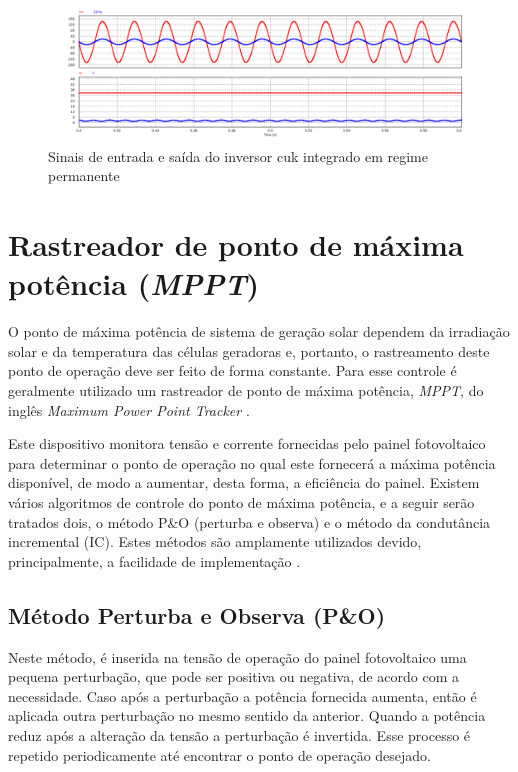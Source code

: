 \documentclass[
	12pt,				%
	openany,
	onseside,
	a4paper,			%
	english,			%
	french,				%
	spanish,			%
	brazil,				%
	]{abntex2}
\begin{document}
\begin{figure}[H]
	\centering
		\includegraphics[width= \linewidth]{cuk_integ_In_Out_zoom}
		\caption{Sinais de entrada e saída do inversor cuk integrado em regime permanente}
		\label{fig:integ_cuk_In_Out_zoom}
\end{figure}


\section{Rastreador de ponto de máxima potência (\textit{MPPT})}

O ponto de máxima potência de sistema de geração solar dependem da irradiação solar e da temperatura das células geradoras e, portanto, o rastreamento deste ponto de operação deve ser feito de forma constante. Para esse controle é geralmente utilizado um rastreador de ponto de máxima potência, \emph{MPPT}, do inglês \textit{Maximum Power Point Tracker} \cite{Talha_MPPT}. 

Este dispositivo monitora tensão e corrente fornecidas pelo painel fotovoltaico para determinar o ponto de operação no qual este fornecerá a máxima potência disponível, de modo a aumentar, desta forma, a eficiência do painel. Existem vários algoritmos de controle do ponto de máxima potência, e a seguir serão tratados dois, o método P\&O (perturba e observa) e o método da condutância incremental (IC). Estes métodos são amplamente utilizados devido, principalmente, a facilidade de implementação \cite{MPPT_P&O_IC}\cite{Talha_MPPT}.


\subsection{Método Perturba e Observa (P\&O)}

Neste método, é inserida na tensão de operação do painel fotovoltaico uma pequena perturbação, que pode ser positiva ou negativa, de acordo com a necessidade. Caso após a perturbação a potência fornecida aumenta, então é aplicada outra perturbação no mesmo sentido da anterior. Quando a potência reduz após a alteração da tensão a perturbação é invertida. Esse processo é repetido periodicamente até encontrar o ponto de operação desejado\cite{Talha_MPPT}.
\end{document}
